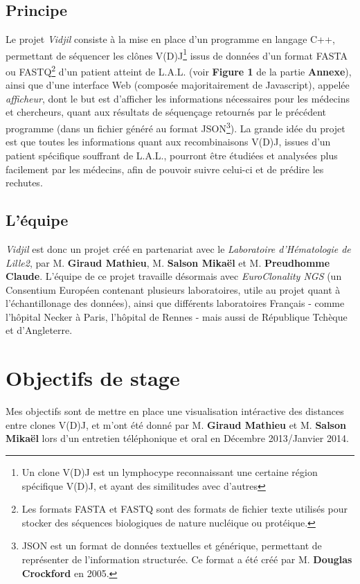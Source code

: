 \documentclass[12pt]{report}
\begin{document}
\begin{spacing}{1.2}
\subsection{Principe}
Le projet \textit{Vidjil} consiste à la mise en place d'un programme en langage C++, permettant de séquencer les clônes V(D)J\footnote{Un clone V(D)J est un lymphocype reconnaissant une certaine région spécifique V(D)J, et ayant des similitudes avec d'autres} issus de données d'un format FASTA ou FASTQ\footnote{Les formats FASTA et FASTQ sont des formats de fichier texte utilisés pour stocker des séquences biologiques de nature nucléique ou protéique.} d'un patient atteint de L.A.L. (voir \textbf{Figure 1} de la partie \textbf{Annexe}), ainsi que d'une interface Web (composée majoritairement de Javascript), appelée \textit{afficheur}, dont le but est d'afficher les informations nécessaires pour les médecins et chercheurs, quant aux résultats de séquençage retournés par le précédent programme (dans un fichier généré au format JSON\footnote{JSON est un format de données textuelles et générique, permettant de représenter de l'information structurée. Ce format a été créé par M. \textbf{Douglas Crockford} en 2005.}).
\newline
La grande idée du projet est que toutes les informations quant aux recombinaisons V(D)J, issues d'un patient spécifique souffrant de L.A.L., pourront être étudiées et analysées plus facilement par les médecins, afin de pouvoir suivre celui-ci et de prédire les rechutes.

\subsection{L'équipe}
\textit{Vidjil} est donc un projet créé en partenariat avec le \textit{Laboratoire d'Hématologie de Lille2}, par M. \textbf{Giraud Mathieu}, M. \textbf{Salson Mikaël} et M. \textbf{Preudhomme Claude}.
\newline
L'équipe de ce projet travaille désormais avec \textit{EuroClonality NGS} (un Consentium Européen contenant plusieurs laboratoires, utile au projet quant à l'échantillonage des données), ainsi que différents laboratoires Français - comme l'hôpital Necker à Paris, l'hôpital de Rennes - mais aussi de République Tchèque et d'Angleterre.

\section{Objectifs de stage}
Mes objectifs sont de mettre en place une visualisation intéractive des distances entre clones V(D)J, et m'ont été donné par M. \textbf{Giraud Mathieu} et M. \textbf{Salson Mikaël} lors d'un entretien téléphonique et oral en Décembre 2013/Janvier 2014.


\end{spacing}
\end{document}
